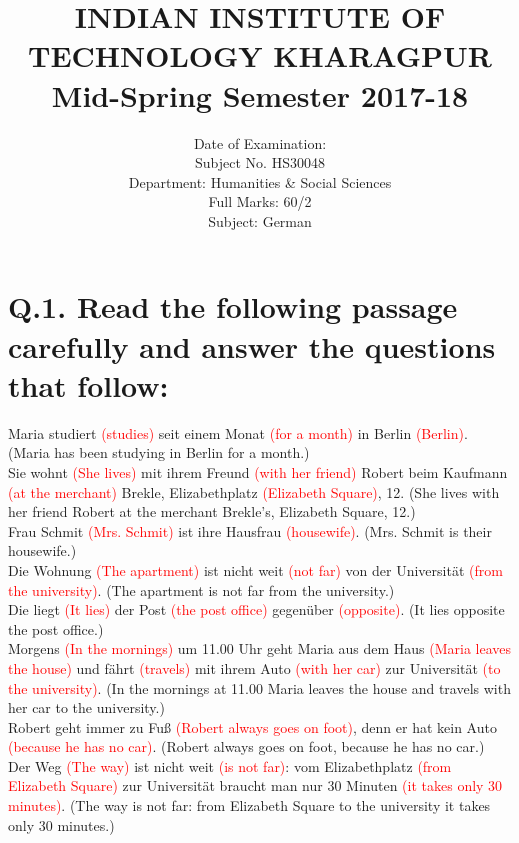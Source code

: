 \documentclass{article}
\title{
INDIAN INSTITUTE OF TECHNOLOGY KHARAGPUR Mid-Spring Semester 2017-18
}
\author{
Date of Examination: \\ Subject No. HS30048 \\ Department: Humanities \& Social Sciences \\ Full Marks: 60/2 \\ Subject: German
}
\date{}
\begin{document}
\maketitle

\section*{Q.1. Read the following passage carefully and answer the questions that follow:}

Maria studiert \textcolor{red}{(studies)} seit einem Monat \textcolor{red}{(for a month)} in Berlin \textcolor{red}{(Berlin)}. (Maria has been studying in Berlin for a month.) \\
Sie wohnt \textcolor{red}{(She lives)} mit ihrem Freund \textcolor{red}{(with her friend)} Robert beim Kaufmann \textcolor{red}{(at the merchant)} Brekle, Elizabethplatz \textcolor{red}{(Elizabeth Square)}, 12. (She lives with her friend Robert at the merchant Brekle's, Elizabeth Square, 12.) \\
Frau Schmit \textcolor{red}{(Mrs. Schmit)} ist ihre Hausfrau \textcolor{red}{(housewife)}. (Mrs. Schmit is their housewife.) \\
Die Wohnung \textcolor{red}{(The apartment)} ist nicht weit \textcolor{red}{(not far)} von der Universität \textcolor{red}{(from the university)}. (The apartment is not far from the university.) \\
Die liegt \textcolor{red}{(It lies)} der Post \textcolor{red}{(the post office)} gegenüber \textcolor{red}{(opposite)}. (It lies opposite the post office.) \\
Morgens \textcolor{red}{(In the mornings)} um 11.00 Uhr geht Maria aus dem Haus \textcolor{red}{(Maria leaves the house)} und fährt \textcolor{red}{(travels)} mit ihrem Auto \textcolor{red}{(with her car)} zur Universität \textcolor{red}{(to the university)}. (In the mornings at 11.00 Maria leaves the house and travels with her car to the university.) \\
Robert geht immer zu Fuß \textcolor{red}{(Robert always goes on foot)}, denn er hat kein Auto \textcolor{red}{(because he has no car)}. (Robert always goes on foot, because he has no car.) \\
Der Weg \textcolor{red}{(The way)} ist nicht weit \textcolor{red}{(is not far)}: vom Elizabethplatz \textcolor{red}{(from Elizabeth Square)} zur Universität braucht man nur 30 Minuten \textcolor{red}{(it takes only 30 minutes)}. (The way is not far: from Elizabeth Square to the university it takes only 30 minutes.)
\end{document}

